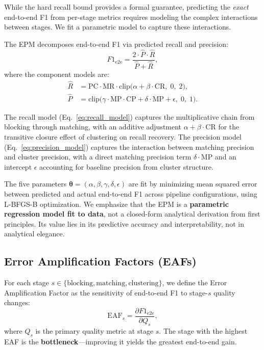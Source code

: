 \documentclass{article}
\newcommand{\PC}{\mathrm{PC}}
\newcommand{\MP}{\mathrm{MP}}
\newcommand{\MR}{\mathrm{MR}}
\newcommand{\CP}{\mathrm{CP}}
\newcommand{\CR}{\mathrm{CR}}
\newcommand{\EAF}{\mathrm{EAF}}
\newcommand{\Fee}{F1_{\mathrm{e2e}}}
\begin{document}
While the hard recall bound provides a formal guarantee, predicting the \emph{exact} end-to-end F1 from per-stage metrics requires modeling the complex interactions between stages. We fit a parametric model to capture these interactions.

The EPM decomposes end-to-end F1 via predicted recall and precision:
\begin{equation}
    \Fee = \frac{2 \cdot \hat{P} \cdot \hat{R}}{\hat{P} + \hat{R}},
    \label{eq:f1_model}
\end{equation}
where the component models are:
\begin{align}
    \hat{R} &= \PC \cdot \MR \cdot \mathrm{clip}\bigl(\alpha + \beta \cdot \CR,\; 0,\; 2\bigr), \label{eq:recall_model} \\
    \hat{P} &= \mathrm{clip}\bigl(\gamma \cdot \MP \cdot \CP + \delta \cdot \MP + \epsilon,\; 0,\; 1\bigr). \label{eq:precision_model}
\end{align}

The recall model (Eq.~\ref{eq:recall_model}) captures the multiplicative chain from blocking through matching, with an additive adjustment $\alpha + \beta \cdot \CR$ for the transitive closure effect of clustering on recall recovery. The precision model (Eq.~\ref{eq:precision_model}) captures the interaction between matching precision and cluster precision, with a direct matching precision term $\delta \cdot \MP$ and an intercept $\epsilon$ accounting for baseline precision from cluster structure.

The five parameters $\boldsymbol{\theta} = (\alpha, \beta, \gamma, \delta, \epsilon)$ are fit by minimizing mean squared error between predicted and actual end-to-end F1 across pipeline configurations, using L-BFGS-B optimization. We emphasize that the EPM is a \textbf{parametric regression model fit to data}, not a closed-form analytical derivation from first principles. Its value lies in its predictive accuracy and interpretability, not in analytical elegance.

\subsection{Error Amplification Factors (EAFs)}

For each stage $s \in \{\text{blocking}, \text{matching}, \text{clustering}\}$, we define the Error Amplification Factor as the sensitivity of end-to-end F1 to stage-$s$ quality changes:
\begin{equation}
    \EAF_s = \frac{\partial \Fee}{\partial Q_s},
\end{equation}
where $Q_s$ is the primary quality metric at stage $s$.
The stage with the highest EAF is the \textbf{bottleneck}---improving it yields the greatest end-to-end gain.
\end{document}
